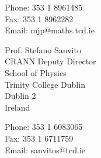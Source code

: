 \documentclass{res}
\begin{document}
\begin{resume}
\begin{multicols}{2}
Phone:  353 1 8961485\\
Fax:  353 1 8962282\\
Email: mjp@maths.tcd.ie

\columnbreak

Prof. Stefano Sanvito\\
CRANN Deputy Director\\
School of Physics\\
Trinity College Dublin\\
Dublin 2\\
Ireland

Phone:  353 1 6083065\\
Fax:  353 1 6711759\\
Email: sanvitos@tcd.ie
\end{multicols}


\end{resume}
\end{document}
